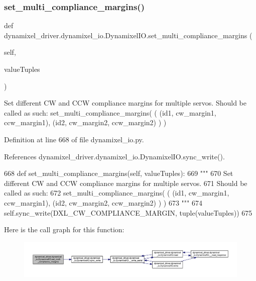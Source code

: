 \subsubsection{\texorpdfstring{set\+\_\+multi\+\_\+compliance\+\_\+margins()}{set\_multi\_compliance\_margins()}}
{\footnotesize\ttfamily def dynamixel\+\_\+driver.\+dynamixel\+\_\+io.\+Dynamixel\+I\+O.\+set\+\_\+multi\+\_\+compliance\+\_\+margins (\begin{DoxyParamCaption}\item[{}]{self,  }\item[{}]{value\+Tuples }\end{DoxyParamCaption})}

\begin{DoxyVerb}Set different CW and CCW compliance margins for multiple servos.
Should be called as such:
set_multi_compliance_margins( ( (id1, cw_margin1, ccw_margin1), (id2, cw_margin2, ccw_margin2) ) )
\end{DoxyVerb}
 

Definition at line 668 of file dynamixel\+\_\+io.\+py.



References dynamixel\+\_\+driver.\+dynamixel\+\_\+io.\+Dynamixel\+I\+O.\+sync\+\_\+write().


\begin{DoxyCode}
668     \textcolor{keyword}{def }set\_multi\_compliance\_margins(self, valueTuples):
669         \textcolor{stringliteral}{"""}
670 \textcolor{stringliteral}{        Set different CW and CCW compliance margins for multiple servos.}
671 \textcolor{stringliteral}{        Should be called as such:}
672 \textcolor{stringliteral}{        set\_multi\_compliance\_margins( ( (id1, cw\_margin1, ccw\_margin1), (id2, cw\_margin2, ccw\_margin2) ) )}
673 \textcolor{stringliteral}{        """}
674         self.sync\_write(DXL\_CW\_COMPLIANCE\_MARGIN, tuple(valueTuples))
675 
\end{DoxyCode}
Here is the call graph for this function\+:
\nopagebreak
\begin{figure}[H]
\begin{center}
\leavevmode
\includegraphics[width=350pt]{dd/d77/classdynamixel__driver_1_1dynamixel__io_1_1_dynamixel_i_o_ab6ae4c7448f85ee22a95510a23be04b2_cgraph}
\end{center}
\end{figure}
\mbox{\label{classdynamixel__driver_1_1dynamixel__io_1_1_dynamixel_i_o_a3c59c5ea5e5e0262fc43d0b2603ca444}} 
